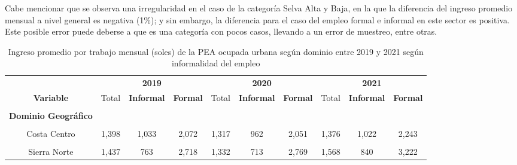 \documentclass[
  letterpaper,
  12pt,
  oneside,
  spanish,
  doublespacing,
  headsepline,
  parskip]{MastersDoctoralThesis}
\begin{document}
Cabe mencionar que se observa una irregularidad en el caso de la
categoría Selva Alta y Baja, en la que la diferencia del ingreso
promedio mensual a nivel general es negativa (1\%); y sin embargo, la
diferencia para el caso del empleo formal e informal en este sector es
positiva. Este posible error puede deberse a que es una categoría con
pocos casos, llevando a un error de muestreo, entre otras.

\hypertarget{tbl-ing_dominio}{}
\begin{table}[H]
\caption{\label{tbl-ing_dominio}Ingreso promedio por trabajo mensual (soles) de la PEA ocupada urbana
según dominio entre 2019 y 2021 según informalidad del empleo }\tabularnewline

\centering\begingroup\fontsize{9}{11}\selectfont

\begin{tabular}{cccccccccc}
\toprule
\multicolumn{1}{c}{ } & \multicolumn{3}{c}{\textbf{2019}} & \multicolumn{3}{c}{\textbf{2020}} & \multicolumn{3}{c}{\textbf{2021}} \\
\cmidrule(l{3pt}r{3pt}){2-4} \cmidrule(l{3pt}r{3pt}){5-7} \cmidrule(l{3pt}r{3pt}){8-10}
\textbf{Variable} & Total & \textbf{Informal} & \textbf{Formal} & Total & \textbf{Informal} & \textbf{Formal} & Total & \textbf{Informal} & \textbf{Formal}\\
\midrule
\cellcolor{gray!6}{\textbf{Nacional}} & \cellcolor{gray!6}{1,595} & \cellcolor{gray!6}{1,037} & \cellcolor{gray!6}{2,599} & \cellcolor{gray!6}{1,407} & \cellcolor{gray!6}{901} & \cellcolor{gray!6}{2,380} & \cellcolor{gray!6}{1,443} & \cellcolor{gray!6}{989} & \cellcolor{gray!6}{2,473}\\
\textbf{Dominio Geográfico} &  &  &  &  &  &  &  &  & \\
\cellcolor{gray!6}{Costa Norte} & \cellcolor{gray!6}{1,302} & \cellcolor{gray!6}{941} & \cellcolor{gray!6}{2,198} & \cellcolor{gray!6}{1,167} & \cellcolor{gray!6}{811} & \cellcolor{gray!6}{2,035} & \cellcolor{gray!6}{1,303} & \cellcolor{gray!6}{947} & \cellcolor{gray!6}{2,273}\\
Costa Centro & 1,398 & 1,033 & 2,072 & 1,317 & 962 & 2,051 & 1,376 & 1,022 & 2,243\\
\cellcolor{gray!6}{Costa Sur} & \cellcolor{gray!6}{1,560} & \cellcolor{gray!6}{1,071} & \cellcolor{gray!6}{2,518} & \cellcolor{gray!6}{1,390} & \cellcolor{gray!6}{918} & \cellcolor{gray!6}{2,317} & \cellcolor{gray!6}{1,401} & \cellcolor{gray!6}{1,008} & \cellcolor{gray!6}{2,397}\\
\addlinespace
Sierra Norte & 1,437 & 763 & 2,718 & 1,332 & 713 & 2,769 & 1,568 & 840 & 3,222\\

\end{tabular}
\end{table}
\end{document}
